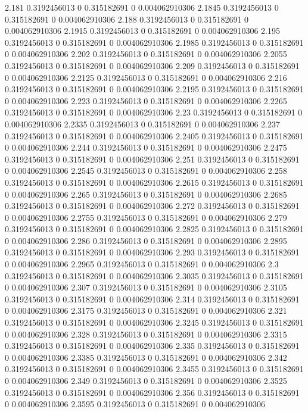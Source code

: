 {2.181 0.3192456013 0 0.315182691 0 0.004062910306
2.1845 0.3192456013 0 0.315182691 0 0.004062910306
2.188 0.3192456013 0 0.315182691 0 0.004062910306
2.1915 0.3192456013 0 0.315182691 0 0.004062910306
2.195 0.3192456013 0 0.315182691 0 0.004062910306
2.1985 0.3192456013 0 0.315182691 0 0.004062910306
2.202 0.3192456013 0 0.315182691 0 0.004062910306
2.2055 0.3192456013 0 0.315182691 0 0.004062910306
2.209 0.3192456013 0 0.315182691 0 0.004062910306
2.2125 0.3192456013 0 0.315182691 0 0.004062910306
2.216 0.3192456013 0 0.315182691 0 0.004062910306
2.2195 0.3192456013 0 0.315182691 0 0.004062910306
2.223 0.3192456013 0 0.315182691 0 0.004062910306
2.2265 0.3192456013 0 0.315182691 0 0.004062910306
2.23 0.3192456013 0 0.315182691 0 0.004062910306
2.2335 0.3192456013 0 0.315182691 0 0.004062910306
2.237 0.3192456013 0 0.315182691 0 0.004062910306
2.2405 0.3192456013 0 0.315182691 0 0.004062910306
2.244 0.3192456013 0 0.315182691 0 0.004062910306
2.2475 0.3192456013 0 0.315182691 0 0.004062910306
2.251 0.3192456013 0 0.315182691 0 0.004062910306
2.2545 0.3192456013 0 0.315182691 0 0.004062910306
2.258 0.3192456013 0 0.315182691 0 0.004062910306
2.2615 0.3192456013 0 0.315182691 0 0.004062910306
2.265 0.3192456013 0 0.315182691 0 0.004062910306
2.2685 0.3192456013 0 0.315182691 0 0.004062910306
2.272 0.3192456013 0 0.315182691 0 0.004062910306
2.2755 0.3192456013 0 0.315182691 0 0.004062910306
2.279 0.3192456013 0 0.315182691 0 0.004062910306
2.2825 0.3192456013 0 0.315182691 0 0.004062910306
2.286 0.3192456013 0 0.315182691 0 0.004062910306
2.2895 0.3192456013 0 0.315182691 0 0.004062910306
2.293 0.3192456013 0 0.315182691 0 0.004062910306
2.2965 0.3192456013 0 0.315182691 0 0.004062910306
2.3 0.3192456013 0 0.315182691 0 0.004062910306
2.3035 0.3192456013 0 0.315182691 0 0.004062910306
2.307 0.3192456013 0 0.315182691 0 0.004062910306
2.3105 0.3192456013 0 0.315182691 0 0.004062910306
2.314 0.3192456013 0 0.315182691 0 0.004062910306
2.3175 0.3192456013 0 0.315182691 0 0.004062910306
2.321 0.3192456013 0 0.315182691 0 0.004062910306
2.3245 0.3192456013 0 0.315182691 0 0.004062910306
2.328 0.3192456013 0 0.315182691 0 0.004062910306
2.3315 0.3192456013 0 0.315182691 0 0.004062910306
2.335 0.3192456013 0 0.315182691 0 0.004062910306
2.3385 0.3192456013 0 0.315182691 0 0.004062910306
2.342 0.3192456013 0 0.315182691 0 0.004062910306
2.3455 0.3192456013 0 0.315182691 0 0.004062910306
2.349 0.3192456013 0 0.315182691 0 0.004062910306
2.3525 0.3192456013 0 0.315182691 0 0.004062910306
2.356 0.3192456013 0 0.315182691 0 0.004062910306
2.3595 0.3192456013 0 0.315182691 0 0.004062910306
}
